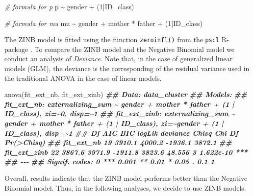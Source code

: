 \documentclass[
]{book}
\newenvironment{Shaded}{\begin{snugshade}}{\end{snugshade}}
\newcommand{\CommentTok}[1]{\textcolor[rgb]{0.56,0.35,0.01}{\textit{#1}}}
\newcommand{\DecValTok}[1]{\textcolor[rgb]{0.00,0.00,0.81}{#1}}
\newcommand{\DocumentationTok}[1]{\textcolor[rgb]{0.56,0.35,0.01}{\textbf{\textit{#1}}}}
\newcommand{\FunctionTok}[1]{\textcolor[rgb]{0.00,0.00,0.00}{#1}}
\newcommand{\NormalTok}[1]{#1}
\newcommand{\SpecialCharTok}[1]{\textcolor[rgb]{0.00,0.00,0.00}{#1}}
\begin{document}
\begin{Shaded}
\begin{Highlighting}[]
\CommentTok{\# formula for p}
\NormalTok{p }\SpecialCharTok{\textasciitilde{}}\NormalTok{ gender }\SpecialCharTok{+}\NormalTok{ (}\DecValTok{1}\SpecialCharTok{|}\NormalTok{ID\_class)}

\CommentTok{\# formula for mu}
\NormalTok{mu }\SpecialCharTok{\textasciitilde{}}\NormalTok{ gender }\SpecialCharTok{+}\NormalTok{ mother }\SpecialCharTok{*}\NormalTok{ father }\SpecialCharTok{+}\NormalTok{ (}\DecValTok{1}\SpecialCharTok{|}\NormalTok{ID\_class)}
\end{Highlighting}
\end{Shaded}

The ZINB model is fitted using the function \texttt{zeroinfl()} from the \texttt{pscl} R-package \citep{zeileisRegressionModelsCount2008}. To compare the ZINB model and the Negative Binomial model we conduct an analysis of \emph{Deviance}. Note that, in the case of generalized linear models (GLM), the deviance is the corresponding of the residual variance used in the traditional ANOVA in the case of linear models.

\begin{Shaded}
\begin{Highlighting}[]
\FunctionTok{anova}\NormalTok{(fit\_ext\_nb, fit\_ext\_zinb)}
\DocumentationTok{\#\# Data: data\_cluster}
\DocumentationTok{\#\# Models:}
\DocumentationTok{\#\# fit\_ext\_nb: externalizing\_sum \textasciitilde{} gender + mother * father + (1 | ID\_class), zi=\textasciitilde{}0, disp=\textasciitilde{}1}
\DocumentationTok{\#\# fit\_ext\_zinb: externalizing\_sum \textasciitilde{} gender + mother * father + (1 | ID\_class), zi=\textasciitilde{}gender + (1 | ID\_class), disp=\textasciitilde{}1}
\DocumentationTok{\#\#              Df    AIC    BIC  logLik deviance  Chisq Chi Df Pr(\textgreater{}Chisq)    }
\DocumentationTok{\#\# fit\_ext\_nb   19 3910.1 4000.2 {-}1936.1   3872.1                             }
\DocumentationTok{\#\# fit\_ext\_zinb 22 3867.6 3971.9 {-}1911.8   3823.6 48.556      3  1.622e{-}10 ***}
\DocumentationTok{\#\# {-}{-}{-}}
\DocumentationTok{\#\# Signif. codes:  0 \textquotesingle{}***\textquotesingle{} 0.001 \textquotesingle{}**\textquotesingle{} 0.01 \textquotesingle{}*\textquotesingle{} 0.05 \textquotesingle{}.\textquotesingle{} 0.1 \textquotesingle{} \textquotesingle{} 1}
\end{Highlighting}
\end{Shaded}

Overall, results indicate that the ZINB model performs better than the Negative Binomial model. Thus, in the following analyses, we decide to use ZINB models.
\end{document}
